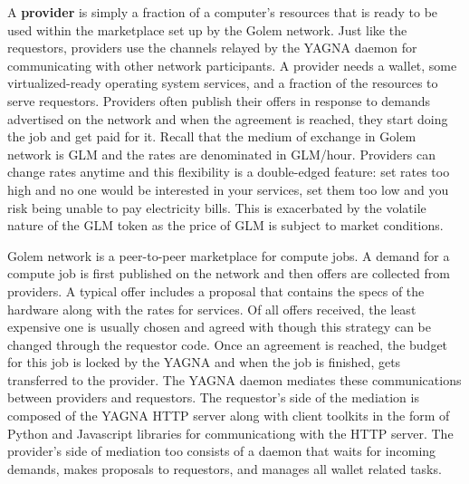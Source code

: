 \documentclass[a4paper, 10pt]{article}
\begin{document}
\par
A \textbf{provider} is simply a fraction of a computer's resources that is ready to be used within the marketplace set up by the Golem network. Just like the requestors, providers use the channels relayed by the YAGNA daemon for communicating with other network participants. A provider needs a wallet, some virtualized-ready operating system services, and a fraction of the resources to serve requestors. Providers often publish their offers in response to demands advertised on the network and when the agreement is reached, they start doing the job and get paid for it. Recall that the medium of exchange in Golem network is GLM and the rates are denominated in GLM/hour. Providers can change rates anytime and this flexibility is a double-edged feature: set rates too high and no one would be interested in your services, set them too low and you risk being unable to pay electricity bills. This is exacerbated by the volatile nature of the GLM token as the price of GLM is subject to market conditions.
\par
Golem network is a peer-to-peer marketplace for compute jobs. A demand for a compute job is first published on the network and then offers are collected from providers. A typical offer includes a proposal that contains the specs of the hardware along with the rates for services. Of all offers received, the least expensive one is usually chosen and agreed with though this strategy can be changed through the requestor code. Once an agreement is reached, the budget for this job is locked by the YAGNA and when the job is finished, gets transferred to the provider. The YAGNA daemon mediates these communications between providers and requestors. The requestor's side of the mediation is composed of the YAGNA HTTP server along with client toolkits in the form of Python and Javascript libraries for communicationg with the HTTP server. The provider's side of mediation too consists of a daemon that waits for incoming demands, makes proposals to requestors, and manages all wallet related tasks.
\end{document}
